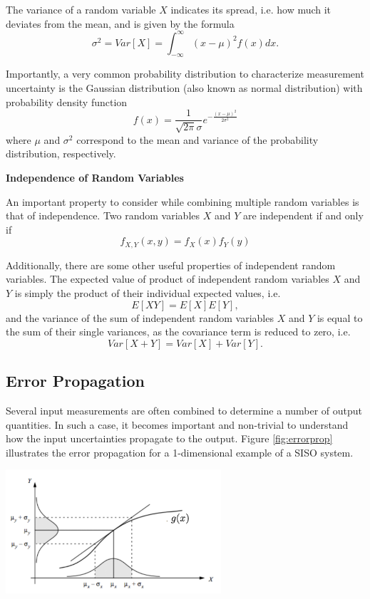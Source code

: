 \documentclass[twoside]{article}
\begin{document}
The variance of a random variable $X$ indicates its spread, i.e. how much it deviates from the mean, and is given by the formula 
$$\sigma^2 = Var[X] = \int_{-\infty}^{\infty} (x-\mu)^2 f(x) dx.$$

Importantly, a very common probability distribution to characterize measurement uncertainty is the Gaussian distribution (also known as normal distribution) with probability density function
$$f(x) = \frac{1}{\sqrt{2\pi}\sigma} e^{-\frac{(x-\mu)^2}{2\sigma^2}}$$
where $\mu$ and $\sigma^2$ correspond to the mean and variance of the probability distribution, respectively. 

\textbf{Independence of Random Variables}

An important property to consider while combining multiple random variables is that of independence. Two random variables $X$ and $Y$ are independent if and only if 
$$f_{X,Y}(x,y) = f_{X}(x) f_{Y}(y)$$

Additionally, there are some other useful properties of independent random variables.
The expected value of product of independent random variables $X$ and $Y$ is simply the product of their individual expected values, i.e.
$$E[XY] = E[X]E[Y],$$
and the variance of the sum of independent random variables $X$ and $Y$ is equal to the sum of their single variances, as the covariance term is reduced to zero, i.e. 
$$Var[X + Y] = Var[X] + Var[Y].$$

\subsection{Error Propagation}
Several input measurements are often combined to determine a number of output quantities. In such a case, it becomes important and non-trivial to understand how the input uncertainties propagate to the output. Figure \ref{fig:errorprop} illustrates the error propagation for a 1-dimensional example of a SISO system.
%
\begin{center}
	\includegraphics[width=0.6\textwidth]{ErrorPropagation_1D}
    \label{fig:errorprop}
\end{center}
\end{document}
